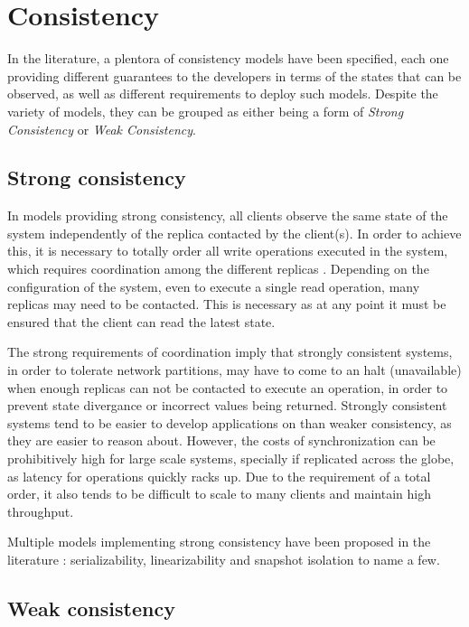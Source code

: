 \section{Consistency}

In the literature, a plentora of consistency models have been specified, each one providing different guarantees to the developers in terms of the states that can be observed, as well as different requirements to deploy such models.
Despite the variety of models, they can be grouped as either being a form of \emph{Strong Consistency} or \emph{Weak Consistency}.

\subsection{Strong consistency}

In models providing strong consistency, all clients observe the same state of the system independently of the replica contacted by the client(s).
In order to achieve this, it is necessary to totally order all write operations executed in the system, which requires coordination among the different replicas \cite{linearizability}.
Depending on the configuration of the system, even to execute a single read operation, many replicas may need to be contacted.
This is necessary as at any point it must be ensured that the client can read the latest state.

The strong requirements of coordination imply that strongly consistent systems, in order to tolerate network partitions, may have to come to an halt (unavailable) when enough replicas can not be contacted to execute an operation, in order to prevent state divergance or incorrect values being returned.
Strongly consistent systems tend to be easier to develop applications on than weaker consistency, as they are easier to reason about.
However, the costs of synchronization can be prohibitively high for large scale systems, specially if replicated across the globe, as latency for operations quickly racks up.
Due to the requirement of a total order, it also tends to be difficult to scale to many clients and maintain high throughput.

Multiple models implementing strong consistency have been proposed in the literature  \cite{linearizability, si}: serializability, linearizability and snapshot isolation to name a few.

\subsection{Weak consistency}


